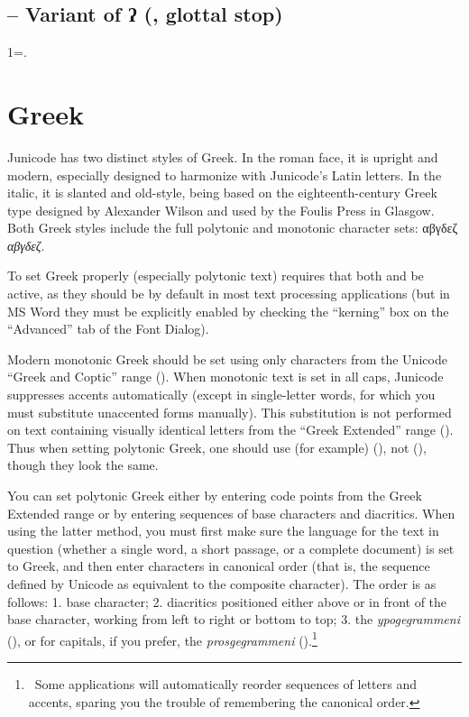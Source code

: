 \subsection{ -- Variant of ʔ (, glottal stop)}
1=.

\section{Greek}
Junicode has two distinct styles of Greek. In the roman face, it is upright and
modern, especially designed to harmonize with Junicode's Latin letters. In the
italic, it is slanted and old-style, being based on the eighteenth-century
Greek type designed by Alexander Wilson and used by the Foulis Press in
Glasgow. Both Greek styles include the full polytonic and monotonic character
sets: αβγδεζ \textit{αβγδεζ}.

To set Greek properly (especially polytonic text) requires that both 
and  be active, as they should be by default in most
text processing applications (but in MS Word they must be explicitly enabled
by checking the ``kerning'' box on the ``Advanced'' tab of the Font Dialog).

Modern monotonic Greek should be set using only characters from the Unicode “Greek
and Coptic” range (). When monotonic text is set in all caps, Junicode
suppresses accents automatically (except in single-letter words, for which
you must substitute unaccented forms manually). This substitution is not
performed on text containing visually identical letters from the ``Greek Extended''
range ().
Thus when setting polytonic Greek, one should use (for example) 
(), not  (),
though they look the same.

You can set polytonic Greek either by entering code points from the Greek
Extended range or by entering sequences of base characters and diacritics.
When using the latter method, you must first make sure the language for the
text in question (whether a single word, a short passage, or a complete
document) is set to Greek, and then enter characters in canonical order
(that is, the sequence defined by Unicode as equivalent to the composite
character). The order is as follows: 1. base character; 2. diacritics
positioned either above or in front of the base character, working from left
to right or bottom to top; 3. the \textit{ypogegrammeni} (), or for
capitals, if you prefer, the \textit{prosgegrammeni} ().\footnote{\ Some
applications will automatically reorder sequences of letters and accents,
sparing you the trouble of remembering the canonical order.}

